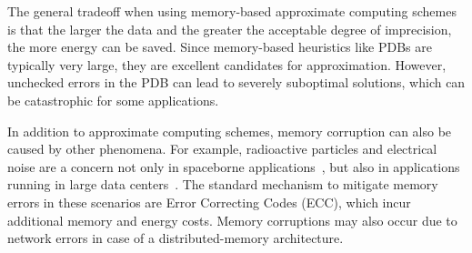 \documentclass[letterpaper]{article}
\begin{document}
The general tradeoff when using memory-based approximate computing schemes is that the larger the data and the greater the acceptable degree of imprecision, the more energy can be saved. Since memory-based heuristics like PDBs are typically very large, they are excellent candidates for approximation. However, unchecked errors in the PDB can lead to severely suboptimal solutions, which can be catastrophic for some applications. %

In addition to approximate computing schemes, memory corruption can also be caused by other phenomena. 
For example, radioactive particles and electrical noise are a concern not only in spaceborne applications~\cite{Wagstaff_kmeansin}, but also in applications running in large data centers~\cite{7266869}. The standard mechanism to mitigate memory errors in these scenarios are Error Correcting Codes (ECC), which incur additional memory and energy costs. %
Memory corruptions may also occur due to network errors in case of a distributed-memory architecture. 

\end{document}
